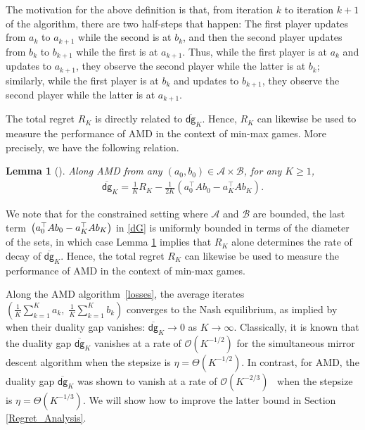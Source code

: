 \documentclass[11pt]{article}
\newtheorem{lemma}{Lemma}
\newcommand{\A}{\mathcal{A}}
\newcommand{\B}{\mathcal{B}}
\newcommand{\dg}{\textsf{dg}}
\begin{document}
The motivation for the above definition is that, from iteration $k$ to iteration $k+1$ of the algorithm, there are two half-steps that happen: The first player updates from $a_{k}$ to $a_{k+1}$ while the second is at $b_{k}$, and then the second player updates from $b_{k}$ to $b_{k+1}$ while the first is at $a_{k+1}$. Thus, while the first player is at $a_{k}$ and updates to $a_{k+1}$, they observe the second player while the latter is at $b_{k}$; similarly, while the first player is at $b_{k}$ and updates to $b_{k+1}$, they observe the second player while the latter is at $a_{k+1}$.

The total regret $R_{K}$ is directly related to $\overline{\dg}_{K}$. Hence, $R_{K}$ can likewise be used to measure the performance of AMD in the context of min-max games. More precisely, we have the following relation.

\begin{lemma}[{\cite[Lemma~3.1]{Wibisono2022}}]\label{dgK_and_RK}
    Along AMD from any $(a_0, b_0) \in \A \times \B$, for any $K\geq 1$,
    \begin{gather}
        \overline{\dg}_{K}=\frac{1}{K}R_{K}-\frac{1}{2K}\left(a_{0}^{\top}Ab_{0}-a_{K}^{\top}Ab_{K}\right).\label{dG}
    \end{gather}
\end{lemma}

We note that for the constrained setting where $\A$ and $\B$ are bounded, the last term $\\\left(a_{0}^{\top}Ab_{0}-a_{K}^{\top}Ab_{K}\right)$ in \eqref{dG} is uniformly bounded in terms of the diameter of the sets, in which case Lemma \ref{dgK_and_RK} implies that $R_{K}$ alone determines the rate of decay of $\overline{\dg}_{K}$. Hence, the total regret $R_{K}$ can likewise be used to measure the performance of AMD in the context of min-max games.

Along the AMD algorithm~\eqref{losses}, the average iterates $\left(\frac{1}{K}\sum_{k=1}^{K}{a_{k}}, \; \frac{1}{K}\sum_{k=1}^{K}{b_{k}}\right)$ converges to the Nash equilibrium, as implied by when their duality gap vanishes: $\overline{\dg}_{K} \to 0$ as $K \to \infty$.
Classically, it is known that the duality gap $\overline{\dg}_K$ vanishes at a rate of $\mathcal{O}\left(K^{-1/2}\right)$ for the simultaneous mirror descent algorithm when the stepsize is $\eta=\Theta\left(K^{-1/2}\right)$.
In contrast, for AMD, the duality gap $\overline{\dg}_K$ was shown to vanish at a rate of $\mathcal{O}\left(K^{-2/3}\right)$~\citep[Corollary~3.3]{Wibisono2022} when the stepsize is $\eta=\Theta\left(K^{-1/3}\right)$. We will show how to improve the latter bound in Section \ref{Regret_Analysis}.
\end{document}
